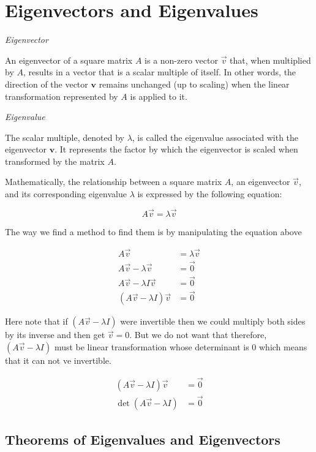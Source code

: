 \newpage
\section{Eigenvectors and Eigenvalues}

\emph{Eigenvector}

An eigenvector of a square matrix \(A\) is a non-zero vector \(\vec{v}\) that, when multiplied by \(A\), results in a vector that is a scalar multiple of itself. In other words, the direction of the vector \(\mathbf{v}\) remains unchanged (up to scaling) when the linear transformation represented by \(A\) is applied to it.

\emph{Eigenvalue}

The scalar multiple, denoted by \(\lambda\), is called the eigenvalue associated with the eigenvector \(\mathbf{v}\). It represents the factor by which the eigenvector is scaled when transformed by the matrix \(A\).
\vspace{\baselineskip}

Mathematically, the relationship between a square matrix \(A\), an eigenvector \(\vec{v}\), and its corresponding eigenvalue \(\lambda\) is 
expressed by the following equation:

\[
A\vec{v} = \lambda\vec{v}
\]

The way we find a method to find them is by manipulating the equation above

\begin{align*}    
A\vec{v} &= \lambda\vec{v}\\
A\vec{v} - \lambda\vec{v} &= \vec{0}\\
A\vec{v} - \lambda I \vec{v} &= \vec{0}\\
(A\vec{v} - \lambda I) \vec{v} &= \vec{0}
\end{align*}

Here note that if \((A\vec{v} - \lambda I)\) were invertible then we could multiply both sides by its inverse 
and then get \(\vec{v} = 0\). But we do not want that therefore, \((A\vec{v} - \lambda I)\) must be linear transformation 
whose determinant is \(0\) which means that it can not ve invertible.

\begin{align*}    
(A\vec{v} - \lambda I) \vec{v} &= \vec{0}\\
\det (A\vec{v} - \lambda I)  &= \vec{0}
\end{align*}

\subsection{Theorems of Eigenvalues and Eigenvectors}

